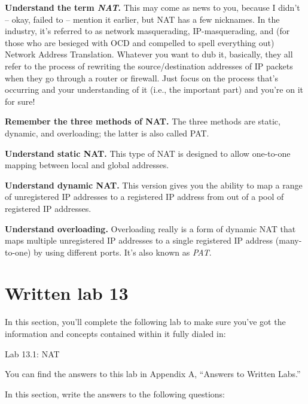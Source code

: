 \textbf{Understand the term \emph{NAT}.} This may come as news to you,
because I didn't -- okay, failed to -- mention it earlier, but NAT has a
few nicknames. In the industry, it's referred to as network
masquerading, IP-masquerading, and (for those who are besieged with OCD
and compelled to spell everything out) Network Address Translation.
Whatever you want to dub it, basically, they all refer to the process of
rewriting the source/destination addresses of IP packets when they go
through a router or firewall. Just focus on the process that's occurring
and your understanding of it (i.e., the important part) and you're on it
for sure!

\textbf{Remember the three methods of NAT.} The three methods are
static, dynamic, and overloading; the latter is also called PAT.

\textbf{Understand static NAT.} This type of NAT is designed to allow
one-to-one mapping between local and global addresses.

\textbf{Understand dynamic NAT.} This version gives you the ability to
map a range of unregistered IP addresses to a registered IP address from
out of a pool of registered IP addresses.

\textbf{Understand overloading.} Overloading really is a form of dynamic
NAT that maps multiple unregistered IP addresses to a single registered
IP address (many-to-one) by using different ports. It's also known as
\emph{PAT}.



\section{Written lab 13}

In this section, you'll complete the following lab to make sure you've
got the information and concepts contained within it fully dialed in:

Lab 13.1: NAT

You can find the answers to this lab in Appendix A, ``Answers to Written
Labs.''

In this section,
write the answers to the following questions:

